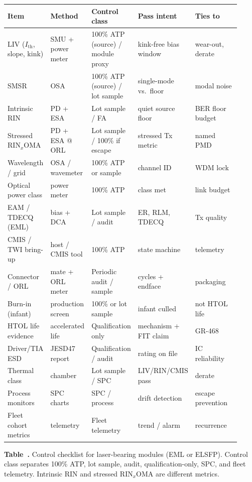 \begin{table}[ht]
\label{tab:atp-laser}%
\centering
\setlength{\tabcolsep}{2.5pt}%
\footnotesize
\renewcommand{\arraystretch}{1.2}%
\begin{tabular}{@{}p{0.18\linewidth}p{0.16\linewidth}p{0.14\linewidth}p{0.22\linewidth}p{0.22\linewidth}@{}}
\toprule
Item & Method & Control class & Pass intent & Ties to \\
\midrule
LIV ($I_\mathrm{th}$, slope, kink) & SMU + power meter & 100\% ATP (source) / module proxy & kink-free bias window & wear-out, derate \\
\addlinespace[1.1em]
SMSR & OSA & 100\% ATP (source) / lot sample & single-mode vs.\ floor & modal noise \\
\addlinespace[1.1em]
Intrinsic RIN & PD + ESA & Lot sample / FA & quiet source floor & BER floor budget \\
\addlinespace[1.1em]
Stressed $\mathrm{RIN}_x\mathrm{OMA}$ & PD + ESA @ ORL & Lot sample / 100\% if escape & stressed Tx metric & named PMD \\
\addlinespace[1.1em]
Wavelength / grid & OSA / wavemeter & 100\% ATP or sample & channel ID & WDM lock \\
\addlinespace[1.1em]
Optical power class & power meter & 100\% ATP & class met & link budget \\
\addlinespace[1.1em]
EAM / TDECQ (EML) & bias + DCA & Lot sample / audit & ER, RLM, TDECQ & Tx quality \\
\addlinespace[1.1em]
CMIS / TWI bring-up & host / CMIS tool & 100\% ATP & state machine & telemetry \\
\addlinespace[1.1em]
Connector / ORL & mate + ORL meter & Periodic audit / sample & cycles + endface & packaging \\
\addlinespace[1.1em]
Burn-in (infant) & production screen & 100\% or lot sample & infant culled & not HTOL life \\
\addlinespace[1.1em]
HTOL life evidence & accelerated life & Qualification only & mechanism + FIT claim & GR-468 \\
\addlinespace[1.1em]
Driver/TIA ESD & JESD47 report & Qualification / audit & rating on file & IC reliability \\
\addlinespace[1.1em]
Thermal class & chamber & Lot sample / SPC & LIV/RIN/CMIS pass & derate \\
\addlinespace[1.1em]
Process monitors & SPC charts & SPC / process & drift detection & escape prevention \\
\addlinespace[1.1em]
Fleet cohort metrics & telemetry & Fleet telemetry & trend / alarm & recurrence \\
\bottomrule
\end{tabular}
\par\medskip
{\raggedright\footnotesize\textbf{Table~\thetable.} Control checklist for laser-bearing
modules (EML or ELSFP). Control class separates 100\% ATP, lot sample, audit,
qualification-only, SPC, and fleet telemetry. Intrinsic RIN and stressed
$\mathrm{RIN}_x\mathrm{OMA}$ are different metrics.\par}
\end{table}
\FloatBarrier

